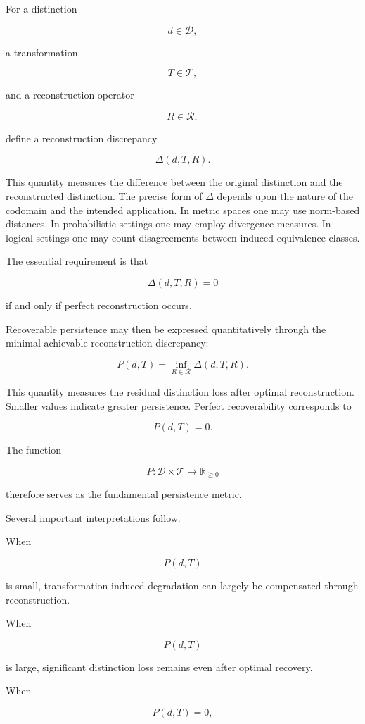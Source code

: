 \documentclass[12pt,oneside]{article}
\theoremstyle{definition}
\begin{document}
For a distinction

\[
d\in\mathcal D,
\]

a transformation

\[
T\in\mathcal T,
\]

and a reconstruction operator

\[
R\in\mathcal R,
\]

define a reconstruction discrepancy

\[
\Delta(d,T,R).
\]

This quantity measures the difference between the original distinction and the reconstructed distinction. The precise form of \(\Delta\) depends upon the nature of the codomain and the intended application. In metric spaces one may use norm-based distances. In probabilistic settings one may employ divergence measures. In logical settings one may count disagreements between induced equivalence classes.

The essential requirement is that

\[
\Delta(d,T,R)=0
\]

if and only if perfect reconstruction occurs.

Recoverable persistence may then be expressed quantitatively through the minimal achievable reconstruction discrepancy:

\[
P(d,T)
=
\inf_{R\in\mathcal R}
\Delta(d,T,R).
\]

This quantity measures the residual distinction loss after optimal reconstruction. Smaller values indicate greater persistence. Perfect recoverability corresponds to

\[
P(d,T)=0.
\]

The function

\[
P:\mathcal D\times\mathcal T
\rightarrow
\mathbb R_{\ge 0}
\]

therefore serves as the fundamental persistence metric.

Several important interpretations follow.

When

\[
P(d,T)
\]

is small, transformation-induced degradation can largely be compensated through reconstruction.

When

\[
P(d,T)
\]

is large, significant distinction loss remains even after optimal recovery.

When

\[
P(d,T)
=
0,
\]
\end{document}
